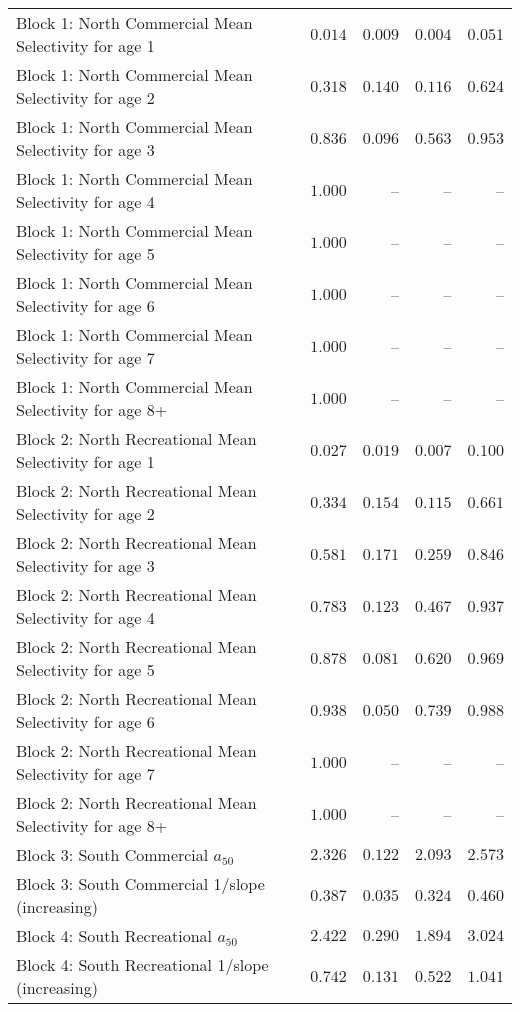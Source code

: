 \documentclass[
]{article}
\begin{document}
\begin{landscape}
\begin{longtable}[t]{lrrrr}
Block 1: North Commercial Mean Selectivity for age 1 & $0.014$ & $0.009$ & $0.004$ & $0.051$\\
Block 1: North Commercial Mean Selectivity for age 2 & $0.318$ & $0.140$ & $0.116$ & $0.624$\\
Block 1: North Commercial Mean Selectivity for age 3 & $0.836$ & $0.096$ & $0.563$ & $0.953$\\
Block 1: North Commercial Mean Selectivity for age 4 & $1.000$ & -- & -- & --\\
\addlinespace
Block 1: North Commercial Mean Selectivity for age 5 & $1.000$ & -- & -- & --\\
Block 1: North Commercial Mean Selectivity for age 6 & $1.000$ & -- & -- & --\\
Block 1: North Commercial Mean Selectivity for age 7 & $1.000$ & -- & -- & --\\
Block 1: North Commercial Mean Selectivity for age 8+ & $1.000$ & -- & -- & --\\
Block 2: North Recreational Mean Selectivity for age 1 & $0.027$ & $0.019$ & $0.007$ & $0.100$\\
\addlinespace
Block 2: North Recreational Mean Selectivity for age 2 & $0.334$ & $0.154$ & $0.115$ & $0.661$\\
Block 2: North Recreational Mean Selectivity for age 3 & $0.581$ & $0.171$ & $0.259$ & $0.846$\\
Block 2: North Recreational Mean Selectivity for age 4 & $0.783$ & $0.123$ & $0.467$ & $0.937$\\
Block 2: North Recreational Mean Selectivity for age 5 & $0.878$ & $0.081$ & $0.620$ & $0.969$\\
Block 2: North Recreational Mean Selectivity for age 6 & $0.938$ & $0.050$ & $0.739$ & $0.988$\\
\addlinespace
Block 2: North Recreational Mean Selectivity for age 7 & $1.000$ & -- & -- & --\\
Block 2: North Recreational Mean Selectivity for age 8+ & $1.000$ & -- & -- & --\\
Block 3: South Commercial $a_{50}$ & $2.326$ & $0.122$ & $2.093$ & $2.573$\\
Block 3: South Commercial 1/slope (increasing) & $0.387$ & $0.035$ & $0.324$ & $0.460$\\
Block 4: South Recreational $a_{50}$ & $2.422$ & $0.290$ & $1.894$ & $3.024$\\
\addlinespace
Block 4: South Recreational 1/slope (increasing) & $0.742$ & $0.131$ & $0.522$ & $1.041$\\

\end{longtable}
\end{landscape}
\end{document}
